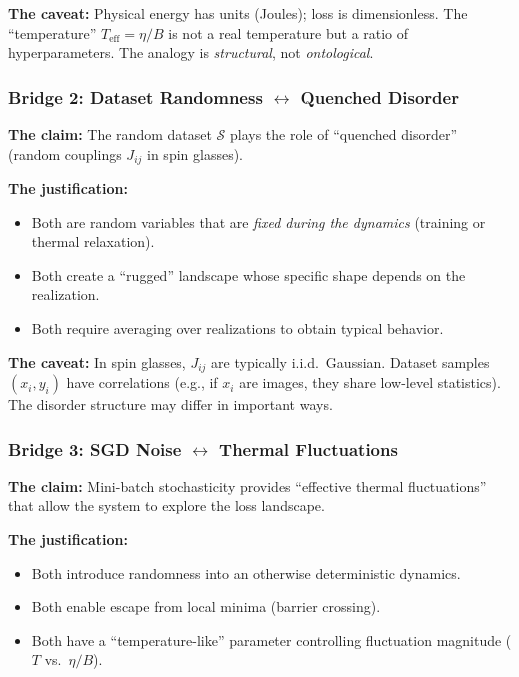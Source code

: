 \documentclass[
  journal=largetwo,
  year=2025,
  volume=37,
]{cup-journal}
\begin{document}
\textbf{The caveat:} Physical energy has units (Joules); loss is dimensionless. The ``temperature'' $T_{\text{eff}} = \eta/B$ is not a real temperature but a ratio of hyperparameters. The analogy is \textit{structural}, not \textit{ontological}.

\subsubsection{Bridge 2: Dataset Randomness $\leftrightarrow$ Quenched Disorder}

\textbf{The claim:} The random dataset $\mathcal{S}$ plays the role of ``quenched disorder'' (random couplings $J_{ij}$ in spin glasses).

\textbf{The justification:}
\begin{itemize}
    \item Both are random variables that are \textit{fixed during the dynamics} (training or thermal relaxation).
    \item Both create a ``rugged'' landscape whose specific shape depends on the realization.
    \item Both require averaging over realizations to obtain typical behavior.
\end{itemize}

\textbf{The caveat:} In spin glasses, $J_{ij}$ are typically i.i.d.\ Gaussian. Dataset samples $(x_i, y_i)$ have correlations (e.g., if $x_i$ are images, they share low-level statistics). The disorder structure may differ in important ways.

\subsubsection{Bridge 3: SGD Noise $\leftrightarrow$ Thermal Fluctuations}

\textbf{The claim:} Mini-batch stochasticity provides ``effective thermal fluctuations'' that allow the system to explore the loss landscape.

\textbf{The justification:}
\begin{itemize}
    \item Both introduce randomness into an otherwise deterministic dynamics.
    \item Both enable escape from local minima (barrier crossing).
    \item Both have a ``temperature-like'' parameter controlling fluctuation magnitude ($T$ vs.\ $\eta/B$).
\end{itemize}
\end{document}
